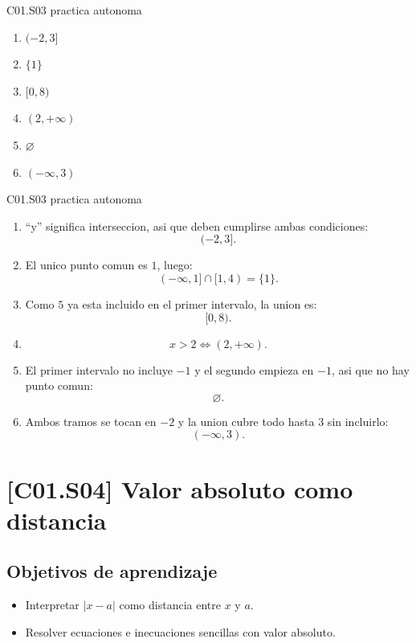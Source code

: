 \begin{shortanswer}{C01.S03 practica autonoma}
\begin{enumerate}[label=\textbf{PX-C01.S03-\arabic*:}, leftmargin=*]
  \item \((-2,3]\)
  \item \(\{1\}\)
  \item \([0,8)\)
  \item \((2,+\infty)\)
  \item \(\varnothing\)
  \item \((-\infty,3)\)
\end{enumerate}
\end{shortanswer}

\begin{fullsolution}{C01.S03 practica autonoma}
\begin{enumerate}[label=\textbf{PX-C01.S03-\arabic*:}, leftmargin=*]
  \item ``y'' significa interseccion, asi que deben cumplirse ambas condiciones:
  \[
  (-2,3].
  \]
  \item El unico punto comun es \(1\), luego:
  \[
  (-\infty,1]\cap [1,4)=\{1\}.
  \]
  \item Como \(5\) ya esta incluido en el primer intervalo, la union es:
  \[
  [0,8).
  \]
  \item
  \[
  x>2 \Longleftrightarrow (2,+\infty).
  \]
  \item El primer intervalo no incluye \(-1\) y el segundo empieza en \(-1\), asi que no hay
  punto comun:
  \[
  \varnothing.
  \]
  \item Ambos tramos se tocan en \(-2\) y la union cubre todo hasta \(3\) sin incluirlo:
  \[
  (-\infty,3).
  \]
\end{enumerate}
\end{fullsolution}

\section{[C01.S04] Valor absoluto como distancia}

\subsection*{Objetivos de aprendizaje}
\begin{itemize}
  \item Interpretar \(|x-a|\) como distancia entre \(x\) y \(a\).
  \item Resolver ecuaciones e inecuaciones sencillas con valor absoluto.
\end{itemize}

